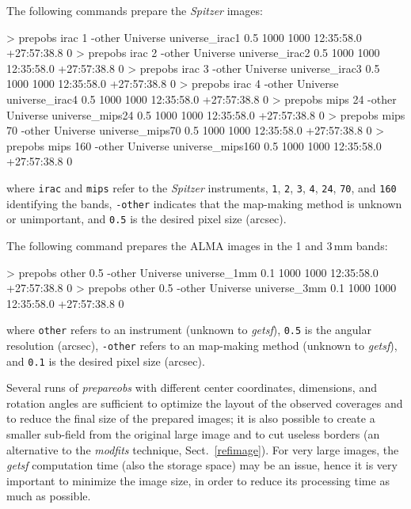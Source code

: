 \documentclass[a4paper,10pt]{article}
\begin{document}
The following commands prepare the \textsl{Spitzer} images:
\begin{verbnobox}[\mbox{}\small]
> prepobs irac   1 -other Universe universe_irac1   0.5 1000 1000 12:35:58.0 +27:57:38.8 0
> prepobs irac   2 -other Universe universe_irac2   0.5 1000 1000 12:35:58.0 +27:57:38.8 0
> prepobs irac   3 -other Universe universe_irac3   0.5 1000 1000 12:35:58.0 +27:57:38.8 0
> prepobs irac   4 -other Universe universe_irac4   0.5 1000 1000 12:35:58.0 +27:57:38.8 0
> prepobs mips  24 -other Universe universe_mips24  0.5 1000 1000 12:35:58.0 +27:57:38.8 0
> prepobs mips  70 -other Universe universe_mips70  0.5 1000 1000 12:35:58.0 +27:57:38.8 0
> prepobs mips 160 -other Universe universe_mips160 0.5 1000 1000 12:35:58.0 +27:57:38.8 0
\end{verbnobox}
where \verb!irac! and \verb!mips! refer to the \emph{Spitzer} instruments, \verb!1!, \verb!2!, \verb!3!, \verb!4!, \verb!24!,
\verb!70!, and \verb!160! identifying the bands, \verb!-other! indicates that the map-making method is unknown or unimportant, and
\verb!0.5! is the desired pixel size (arcsec).

The following command prepares the ALMA images in the 1 and 3\,mm bands:
\begin{verbnobox}[\mbox{}\small]
> prepobs other 0.5 -other Universe universe_1mm 0.1 1000 1000 12:35:58.0 +27:57:38.8 0
> prepobs other 0.5 -other Universe universe_3mm 0.1 1000 1000 12:35:58.0 +27:57:38.8 0
\end{verbnobox}
where \verb!other! refers to an instrument (unknown to \textsl{getsf}), \verb!0.5! is the angular resolution (arcsec),
\verb!-other! refers to an map-making method (unknown to \textsl{getsf}), and \verb!0.1! is the desired pixel size (arcsec).

Several runs of \textsl{prepareobs} with different center coordinates, dimensions, and rotation angles are sufficient to optimize
the layout of the observed coverages and to reduce the final size of the prepared images; it is also possible to create a smaller
sub-field from the original large image and to cut useless borders (an alternative to the \textsl{modfits} technique,
Sect.~\ref{refimage}). For very large images, the \textsl{getsf} computation time (also the storage space) may be an issue, hence
it is very important to minimize the image size, in order to reduce its processing time as much as possible.
\end{document}
